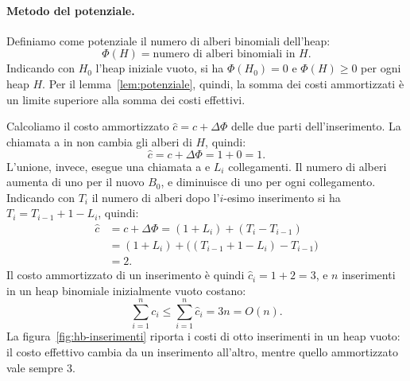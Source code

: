 \paragraph{Metodo del potenziale.}
Definiamo come potenziale il numero di alberi binomiali dell'heap:
\[
\Phi(H) = \text{numero di alberi binomiali in } H.
\]
Indicando con $H_0$ l'heap iniziale vuoto, si ha $\Phi(H_0) = 0$ e $\Phi(H) \ge 0$ per ogni heap $H$. Per il lemma~\ref{lem:potenziale}, quindi, la somma dei costi ammortizzati è un limite superiore alla somma dei costi effettivi.

Calcoliamo il costo ammortizzato $\hat c = c + \Delta\Phi$ delle due parti dell'inserimento. La chiamata a \MakeBinomialHeap{} in \BinomialHeapInsert{} non cambia gli alberi di $H$, quindi:
\[
\hat c = c + \Delta\Phi = 1 + 0 = 1.
\]
L'unione, invece, esegue una chiamata a \MakeBinomialHeap{} e $L_i$ collegamenti. Il numero di alberi aumenta di uno per il nuovo $B_0$, e diminuisce di uno per ogni collegamento. Indicando con $T_i$ il numero di alberi dopo l'$i$-esimo inserimento si ha $T_i = T_{i-1} + 1 - L_i$, quindi:
\[
\begin{aligned}
\hat c &= c + \Delta\Phi = (1 + L_i) + (T_i - T_{i-1}) \\
&= (1 + L_i) + \big((T_{i-1} + 1 - L_i) - T_{i-1}\big) \\
&= 2.
\end{aligned}
\]
Il costo ammortizzato di un inserimento è quindi $\hat c_i = 1 + 2 = 3$, e $n$ inserimenti in un heap binomiale inizialmente vuoto costano:
\[
\sum_{i=1}^{n} c_i \le \sum_{i=1}^{n} \hat c_i = 3n = O(n).
\]
La figura~\ref{fig:hb-inserimenti} riporta i costi di otto inserimenti in un heap vuoto: il costo effettivo cambia da un inserimento all'altro, mentre quello ammortizzato vale sempre $3$.

